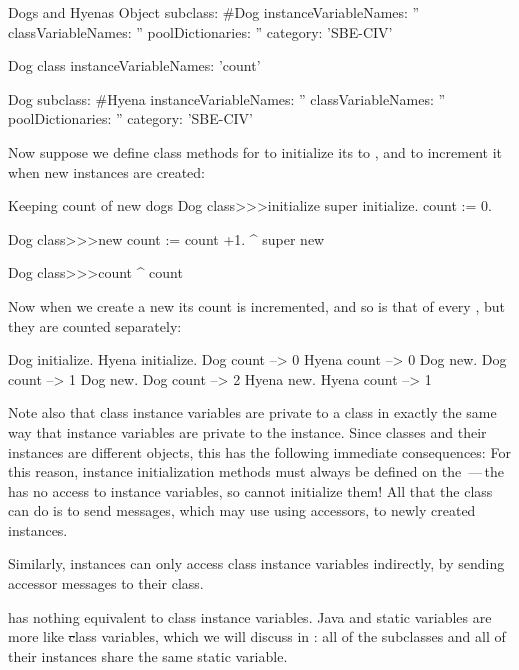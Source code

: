 \documentclass[a4paper,10pt,twoside]{book}
\begin{document}
\begin{classdef}[dog]{Dogs and Hyenas}
Object subclass: #Dog
	instanceVariableNames: ''
	classVariableNames: ''
	poolDictionaries: ''
	category: 'SBE-CIV'

Dog class
	instanceVariableNames: 'count'

Dog subclass: #Hyena
	instanceVariableNames: ''
	classVariableNames: ''
	poolDictionaries: ''
	category: 'SBE-CIV'
\end{classdef}

Now suppose we define class methods for  to initialize its  to , and to increment it when new instances are created:
\begin{method}[dogcount]{Keeping count of new dogs}
Dog class>>>initialize
	super initialize.
	count := 0.

Dog class>>>new
	count := count +1.
	^ super new

Dog class>>>count
	^ count
\end{method}

Now when we create a new  its count is incremented, and so is that of every , but they are counted separately:
\begin{code}{}
Dog initialize.
Hyena initialize.
Dog count     --> 0
Hyena count --> 0
Dog new.
Dog count     --> 1
Dog new.
Dog count     --> 2
Hyena new.
Hyena count --> 1
\end{code}

Note also that class instance variables are private to a class in exactly the same way that instance variables are private to the instance.
Since classes and their instances are different objects,
this has the following immediate consequences:
For this reason, instance initialization methods must always be defined on the \,---\,the  has no access to instance variables, so cannot initialize them!  
All that the class can do is to send  messages, which may use using accessors, to newly created instances.

Similarly, instances can only access class instance variables indirectly, by sending accessor messages to their class.

 has nothing equivalent to class instance variables.  
Java and  static variables are more like \st class variables, which we will discuss in : all of the subclasses and all of their instances share the same static variable.
\end{document}
